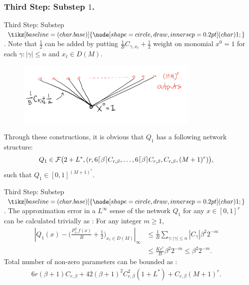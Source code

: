 \documentclass{if-beamer}
\DeclarePairedDelimiter{\ceil}{\lceil}{\rceil}
\newcommand*\circled[1]{\tikz[baseline=(char.base)]{
            \node[shape=circle,draw,inner sep=0.2pt] (char) {#1};}}
\begin{document}
\subsubsection{Third Step: Substep $1$.}
\begin{frame}{Third Step: Substep $\circled{1}$.}
Note that $\frac{1}{2}$ can be added by putting $\frac{1}{B}C_{\gamma,x_{\ell}}+\frac{1}{2}$ weight on monomial $x^{0}=1$ for each $\gamma:|\gamma|\leq n$ and $x_{\ell}\in D(M)$.
\begin{figure}[htbp]
    \includegraphics[width=0.8\textwidth]{one-half.png}
    \label{fig:figure9}
\end{figure}

Through these constructions, it is obvious that $Q_{1}$ has a following network structure:
\begin{equation*}
    Q_{1}\in \mathcal{F}\big(2+L^*,
            (r,6\ceil{\beta}C_{r,\beta},\dots,6\ceil{\beta}C_{r,\beta},C_{r,\beta},(M+1)^{r})\big),
\end{equation*}
such that $Q_{1}\in[0,1]^{(M+1)^{r}}$.
\end{frame}

\begin{frame}{Third Step: Substep $\circled{1}$.}
The approximation error in a $L^{\infty}$ sense of the network $Q_{1}$ for any $x\in[0,1]^{r}$ can be calculated trivially as : For any integer $m\geq 1$,
\begin{align*}
\left|Q_{1}(x)-\bigg( \frac{P^{\beta}_{x_{\ell}}f(x)}{B} + \frac{1}{2} \bigg)_{x_{\ell}\in D(M)} \right|_{\infty}
&\leq \frac{1}{B}\sum_{\gamma:|\gamma|\leq n}|C_{\gamma}|\beta^{2}2^{-m}\\
&\leq \frac{Ke^{r}}{B}\beta^{2}2^{-m}\leq \beta^{2}2^{-m}. 
\end{align*}
Total number of non-zero parameters can be bounded as :
\begin{align*}
6r(\beta+1)C_{r,\beta}+42(\beta+1)^{2}C_{r,\beta}^{2}(1+L^*)+C_{r,\beta}(M+1)^{r}.
\end{align*}
\end{frame}
\end{document}
